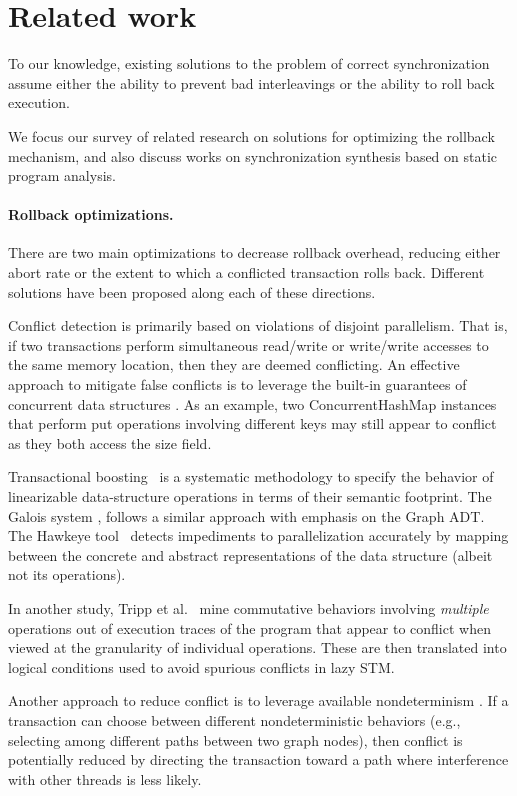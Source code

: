 \section{Related work}
To our knowledge, existing solutions to the problem of correct synchronization assume either the ability to prevent bad interleavings or the ability to roll back execution. 

We focus our survey of related research on solutions for optimizing the rollback mechanism, and also discuss works on synchronization synthesis based on static program analysis.

\paragraph{Rollback optimizations.}
There are two main optimizations to decrease rollback overhead, reducing either abort rate or the extent to which a conflicted transaction rolls back. Different solutions have been proposed along each of these directions.

Conflict detection is primarily based on violations of disjoint parallelism. That is, if two transactions perform simultaneous read/write or write/write accesses to the same memory location, then they are deemed conflicting. 
%
An effective approach to mitigate false conflicts is to leverage the built-in guarantees of concurrent data structures \cite{ppopp/HerlihyK08,Galois,TYFS:OOPSLA11}. As an example, two {\sf ConcurrentHashMap} instances that perform {\sf put} operations involving different keys may still appear to conflict as they both access the {\sf size} field.

Transactional boosting~\cite{ppopp/HerlihyK08} is a systematic methodology to specify the behavior of linearizable data-structure operations in terms of their semantic footprint. The Galois system \cite{Galois}, follows a similar approach with emphasis on the {\sf Graph} ADT. The Hawkeye tool~\cite{TYFS:OOPSLA11} detects impediments to parallelization accurately by mapping between the concrete and abstract representations of the data structure (albeit not its operations).

In another study, Tripp et al.~\cite{TMFS:PLDI12} mine commutative behaviors involving \emph{multiple} operations out of execution traces of the program that appear to conflict when viewed at the granularity of individual operations. These are then translated into logical conditions used to avoid spurious conflicts in lazy STM.

Another approach to reduce conflict is to leverage available nondeterminism \cite{TKS:OOPSLA13}. If a transaction can choose between different nondeterministic behaviors (e.g., selecting among different paths between two graph nodes), then conflict is potentially reduced by directing the transaction toward a path where interference with other threads is less likely.

